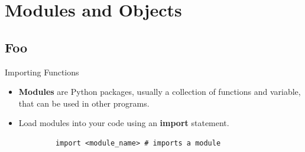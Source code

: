 \documentclass[serif,xcolor=pdftex,dvipsnames,table,hyperref={bookmarks=false,breaklinks}]{beamer}
\begin{document}
\maketitlepage

%
%

\section{Modules and Objects}
\subsection{Foo}

%

\begin{frame}[t,fragile]{Importing Functions}
	\begin{itemize}[<+->]
		\item \textbf{Modules} are Python packages, usually a collection of functions and variable, that can be used in other programs.
		\item Load modules into your code using an \textbf{import} statement.
	\end{itemize}
	\pause
	\begin{tcolorbox}
		\begin{verbatim}
			import <module_name> # imports a module
		\end{verbatim}
	\end{tcolorbox}
\end{frame}
\end{document}
